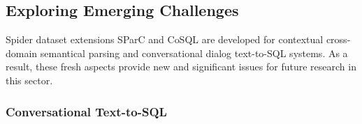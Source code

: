 \subsection{Exploring Emerging Challenges}

Spider dataset extensions SParC and CoSQL are developed for contextual cross-domain semantical parsing and conversational dialog text-to-SQL systems.
As a result, these fresh aspects provide new and significant issues for future research in this sector.

\subsubsection{Conversational Text-to-SQL}


